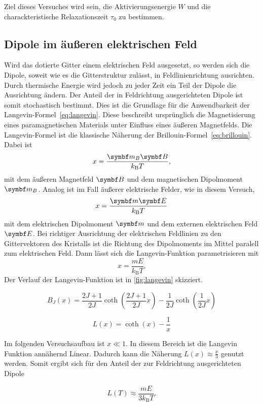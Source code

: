 Ziel dieses Versuches wird sein, die Aktivierungsenergie $W$ und die charackteristische Relaxationszeit $τ_0$ zu bestimmen.

\subsection{Dipole im äußeren elektrischen Feld }

Wird das dotierte Gitter einem elektrischen Feld ausgesetzt, so werden sich die Dipole,
soweit wie es die Gitterstruktur zulässt, in Feldlinienrichtung ausrichten.
Durch thermische Energie wird jedoch zu jeder Zeit ein Teil der Dipole die Ausrichtung ändern.
Der Anteil der in Feldrichtung ausgerichteten Dipole ist somit stochastisch bestimmt.
Dies ist die Grundlage für die Anwendbarkeit der Langevin-Formel~\eqref{eq:langevin}.
Diese beschreibt ursprünglich die Magnetisierung eines paramagnetischen Materials unter Einfluss eines äußeren Magnetfelds.
Die Langevin-Formel ist die klassische
Näherung der Brillouin-Formel~\eqref{eq:brillouin}.
Dabei ist
\begin{equation}
  x = \frac{\v{m}_B \v{B}}{k_\mathrm{B} T},
\end{equation}
mit dem äußeren Magnetfeld $\v{B}$ und dem magnetischen Dipolmoment $\v{m}_B$.
Analog ist im Fall äußerer elektrische Felder, wie in diesem Versuch,
\begin{equation}
  x = \frac{\v{m} \v{E}}{k_\mathrm{B} T}
\end{equation}
mit dem elektrischen Dipolmoment $\v{m}$ und dem externen elektrischen Feld $\v{E}$.
Bei richtiger Ausrichtung der elektrischen Feldlinien zu den Gittervektoren des Kristalls ist die Richtung des Dipolmoments im Mittel paralell zum elektrischen Feld.
Dann lässt sich die Langevin-Funktion parametrisieren mit
\begin{equation}
  x= \frac{m E}{k_\mathrm{B} T}.
\end{equation}
Der Verlauf der Langevin-Funktion ist in \autoref{fig:langevin} skizziert.

\begin{equation}
  B_J(x) =   \frac{2J + 1}{2J} \coth\!\left( \frac{2J + 1}{2J} x \right)
           - \frac{1}{2J} \coth\!\left(\frac{1}{2J} x \right)
  \label{eq:brillouin}
\end{equation}

\begin{equation}
  \label{eq:langevin}
  L(x) = \coth(x) - \frac{1}{x}
\end{equation}
%


Im folgenden Versuchsaufbau ist $ x \ll 1 $. In diesem Bereich ist die Langevin Funktion annähernd Linear.
Dadurch kann die Näherung $L(x) \approx \frac{x}{3}$ genutzt werden.
Somit ergibt sich für den Anteil der zur Feldrichtung ausgerichteten Dipole

\begin{equation}
  L(T) \approx \frac{m E}{3 k_\mathrm{B} T}.
  \label{eq:dipoles}
\end{equation}
